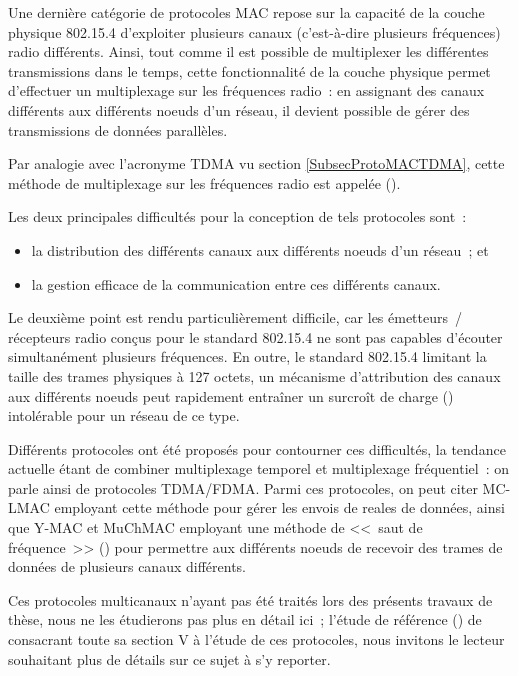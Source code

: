 Une dernière catégorie de protocoles MAC repose sur la capacité de la
couche physique 802.15.4 d'exploiter plusieurs canaux (c'est-à-dire
plusieurs fréquences) radio différents. Ainsi, tout comme il est possible
de multiplexer les différentes transmissions dans le temps, cette
fonctionnalité de la couche physique permet d'effectuer un multiplexage sur
les fréquences radio~: en assignant des canaux différents aux différents
noeuds d'un réseau, il devient possible de gérer des transmissions de
données parallèles.

Par analogie avec l'acronyme TDMA vu section \vref{SubsecProtoMACTDMA},
cette méthode de multiplexage sur les fréquences radio est appelée
 ().

Les deux principales difficultés pour la conception de tels protocoles sont~:
\begin{itemize}
\item la distribution des différents canaux aux différents noeuds
d'un réseau~; et
\item la gestion efficace de la communication entre ces différents canaux.
\end{itemize}
Le deuxième point est rendu particulièrement difficile, car les émetteurs~/
récepteurs radio conçus pour le standard 802.15.4 ne sont pas capables
d'écouter simultanément plusieurs fréquences.
En outre, le standard 802.15.4 limitant la taille des trames physiques
à 127 octets, un mécanisme d'attribution des canaux aux différents noeuds
peut rapidement entraîner un surcroît de charge ()
intolérable pour un réseau de ce type.

Différents protocoles ont été proposés pour contourner ces difficultés,
la tendance actuelle étant de combiner multiplexage temporel et multiplexage
fréquentiel~: on parle ainsi de protocoles TDMA/FDMA. Parmi ces protocoles,
on peut citer MC-LMAC employant cette méthode pour gérer les envois de
reales de données, ainsi que Y-MAC et MuChMAC employant une méthode
de <<~saut de fréquence~>> () pour permettre
aux différents noeuds de recevoir des trames de données de plusieurs
canaux différents.

Ces protocoles multicanaux n'ayant pas été traités lors des présents
travaux de thèse, nous ne les étudierons pas plus en détail ici~;
l'étude de référence () de
\cite{Evolution-MAC-WSN-Survey-2013} consacrant toute sa section V
à l'étude de ces protocoles, nous invitons le lecteur souhaitant plus
de détails sur ce sujet à s'y reporter.

